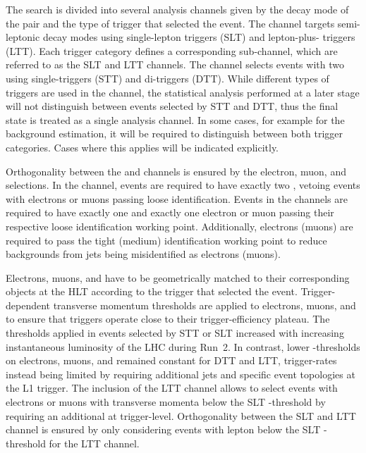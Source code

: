 The search is divided into several analysis channels given by the
decay mode of the \taulepton pair and the type of trigger that
selected the event. The \lephad channel targets semi-leptonic decay
modes using single-lepton triggers (SLT) and lepton-plus-\tauhadvis
triggers (LTT). Each trigger category defines a corresponding
sub-channel, which are referred to as the \lephad SLT and \lephad LTT
channels. The \hadhad channel selects events with two \tauhadvis using
single-\tauhadvis triggers (STT) and di-\tauhadvis triggers
(DTT). While different types of triggers are used in the \hadhad
channel, the statistical analysis performed at a later stage will not
distinguish between events selected by STT and DTT, thus the \hadhad
final state is treated as a single analysis channel. In some cases,
for example for the background estimation, it will be required to
distinguish between both trigger categories. Cases where this applies
will be indicated explicitly.

Orthogonality between the \lephad and \hadhad channels is ensured by
the electron, muon, and \tauhadvis selections. In the \hadhad channel,
events are required to have exactly two \tauhadvis, vetoing events
with electrons or muons passing loose identification. Events in the
\lephad channels are required to have exactly one \tauhadvis and
exactly one electron or muon passing their respective loose
identification working point. Additionally, electrons (muons) are
required to pass the tight (medium) identification working point to
reduce backgrounds from jets being misidentified as electrons (muons).

Electrons, muons, and \tauhadvis have to be geometrically matched to
their corresponding objects at the HLT according to the trigger that
selected the event. Trigger-dependent transverse momentum thresholds
are applied to electrons, muons, and \tauhadvis to ensure that
triggers operate close to their trigger-efficiency plateau. The
thresholds applied in events selected by STT or SLT increased with
increasing instantaneous luminosity of the LHC during Run~2. In
contrast, lower \pT-thresholds on electrons, muons, and \tauhadvis
remained constant for DTT and LTT, trigger-rates instead being limited
by requiring additional jets and specific event topologies at the L1
trigger. The inclusion of the \lephad LTT channel allows to select
events with electrons or muons with transverse momenta below the SLT
\pT-threshold by requiring an additional \tauhadvis at
trigger-level. Orthogonality between the \lephad SLT and LTT channel
is ensured by only considering events with lepton \pT below the SLT
\pT-threshold for the LTT channel.

